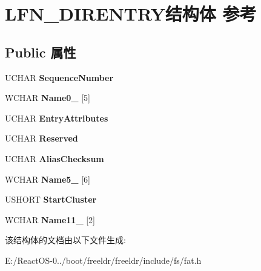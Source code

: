 \hypertarget{struct_l_f_n___d_i_r_e_n_t_r_y}{}\section{L\+F\+N\+\_\+\+D\+I\+R\+E\+N\+T\+R\+Y结构体 参考}
\label{struct_l_f_n___d_i_r_e_n_t_r_y}
\subsection*{Public 属性}
\begin{DoxyCompactItemize}
\item 
\mbox{\label{struct_l_f_n___d_i_r_e_n_t_r_y_a5f08dfe136b71232a479eafb69975532}} 
U\+C\+H\+AR {\bfseries Sequence\+Number}
\item 
\mbox{\label{struct_l_f_n___d_i_r_e_n_t_r_y_a94c2c97beb67bd8caaf4ba5d6867cf3e}} 
W\+C\+H\+AR {\bfseries Name0\+\_} \mbox{[}5\mbox{]}
\item 
\mbox{\label{struct_l_f_n___d_i_r_e_n_t_r_y_a3e362ac665e600181ddcaa17e28633dd}} 
U\+C\+H\+AR {\bfseries Entry\+Attributes}
\item 
\mbox{\label{struct_l_f_n___d_i_r_e_n_t_r_y_ae9e0ae701fd2159887bd5e233bef45e4}} 
U\+C\+H\+AR {\bfseries Reserved}
\item 
\mbox{\label{struct_l_f_n___d_i_r_e_n_t_r_y_ae3d4e0ae10fa2524a76f6f0a431fd62f}} 
U\+C\+H\+AR {\bfseries Alias\+Checksum}
\item 
\mbox{\label{struct_l_f_n___d_i_r_e_n_t_r_y_a6e260917a0dce9719ce709b56eab1aa5}} 
W\+C\+H\+AR {\bfseries Name5\+\_} \mbox{[}6\mbox{]}
\item 
\mbox{\label{struct_l_f_n___d_i_r_e_n_t_r_y_a6dd48e54ea85f4ca7aaa9a5a306c3dd0}} 
U\+S\+H\+O\+RT {\bfseries Start\+Cluster}
\item 
\mbox{\label{struct_l_f_n___d_i_r_e_n_t_r_y_a2243e348da88c9adbf105dfef8a58622}} 
W\+C\+H\+AR {\bfseries Name11\+\_} \mbox{[}2\mbox{]}
\end{DoxyCompactItemize}


该结构体的文档由以下文件生成\+:\begin{DoxyCompactItemize}
\item 
E\+:/\+React\+O\+S-\/0../boot/freeldr/freeldr/include/fs/fat.\+h\end{DoxyCompactItemize}
